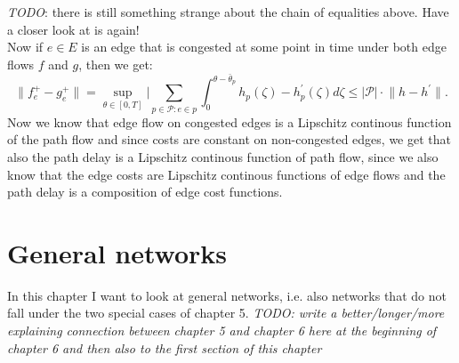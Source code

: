 \documentclass[reqno,openany]{amsbook}
\theoremstyle{definition}
\theoremstyle{plain}
\begin{document}
\emph{TODO}: there is still something strange about the chain of equalities above. Have a closer look at is again! \\
Now if $e \in E$ is an edge that is congested at some point in time under both edge flows $f$ and $g$, then we get:
\[ \lVert f_e^+ - g_e^+ \rVert = \sup_{\theta \in [0, T]} \lvert \sum_{p \in \mathcal{P}: e \in p} \int_0^{\theta - \bar{\theta}_p}
h_p(\zeta) - h_p^{\prime}(\zeta) d\zeta \leq \lvert \mathcal{P} \rvert \cdot \lVert h - h^{\prime} \rVert. \]
Now we know that edge flow on congested edges is a Lipschitz continous function of the path flow and since costs are constant on non-congested edges, we get that also the path delay is a Lipschitz continous function of path flow, since we also know that the edge costs are Lipschitz continous functions of edge flows and the path delay is a composition of edge cost functions.





\chapter{General networks}
In this chapter I want to look at general networks, i.e. also networks that do not fall under the two special cases of chapter 5. \emph{TODO: write a better/longer/more explaining connection between chapter 5 and chapter 6 here at the beginning of chapter 6 and then also to the first section of this chapter}
\end{document}
